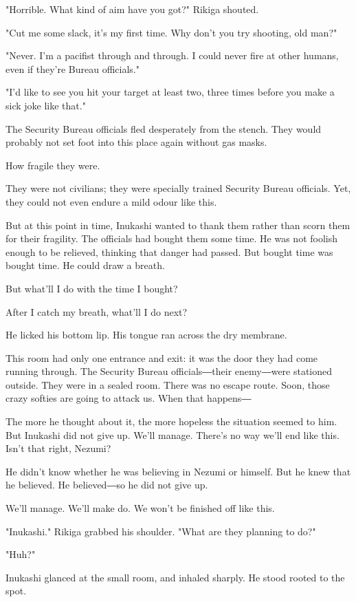 "Horrible. What kind of aim have you got?" Rikiga shouted.

"Cut me some slack, it's my first time. Why don't you try shooting, old
man?"

"Never. I'm a pacifist through and through. I could never fire at other
humans, even if they're Bureau officials."

"I'd like to see you hit your target at least two, three times before
you make a sick joke like that."

The Security Bureau officials fled desperately from the stench. They
would probably not set foot into this place again without gas masks.

How fragile they were.

They were not civilians; they were specially trained Security Bureau
officials. Yet, they could not even endure a mild odour like this.

But at this point in time, Inukashi wanted to thank them rather than
scorn them for their fragility. The officials had bought them some time.
He was not foolish enough to be relieved, thinking that danger had
passed. But bought time was bought time. He could draw a breath.

But what'll I do with the time I bought?

After I catch my breath, what'll I do next?

He licked his bottom lip. His tongue ran across the dry membrane.

This room had only one entrance and exit: it was the door they had come
running through. The Security Bureau officials―their enemy―were
stationed outside. They were in a sealed room. There was no escape
route. Soon, those crazy softies are going to attack us. When that
happens―

The more he thought about it, the more hopeless the situation seemed to
him. But Inukashi did not give up. We'll manage. There's no way we'll
end like this. Isn't that right, Nezumi?

He didn't know whether he was believing in Nezumi or himself. But he
knew that he believed. He believed―so he did not give up.

We'll manage. We'll make do. We won't be finished off like this.

"Inukashi." Rikiga grabbed his shoulder. "What are they planning to do?"

"Huh?"

Inukashi glanced at the small room, and inhaled sharply. He stood rooted
to the spot.

